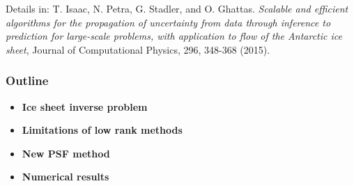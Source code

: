 \documentclass[10pt,final,xcolor=dvipsnames]{beamer}
\begin{document}
\begin{frame}
	\vspace{0.3in}
	\scriptsize{Details in: T. Isaac, N. Petra, G. Stadler, and
		O. Ghattas. {\em Scalable and efficient algorithms for the
			propagation of uncertainty from data through inference to
			prediction for large-scale problems, with application to flow of
			the Antarctic ice sheet}, Journal of Computational Physics, 296,
		348-368 (2015).}
\end{frame}

\begin{frame}
	\frametitle{Outline}
	{\Large
		\begin{itemize}
			\setlength\itemsep{2em}
			\item \textbf{Ice sheet inverse problem}
			\item \textbf{Limitations of low rank methods}
			\item \textbf{New PSF method}
			\item \textbf{Numerical results}		
		\end{itemize}
	}
\end{frame}
\end{document}
